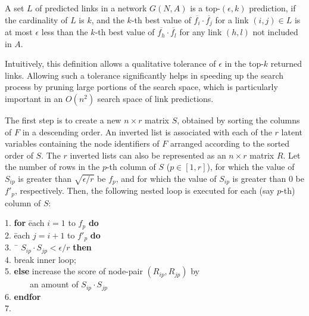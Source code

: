 \begin{definition}[top-$(\epsilon, k)$ predictions]
A set $L$ of predicted links in a network $G(N, A)$ is a top-$(\epsilon, k)$ prediction, if
the cardinality of $L$ is $k$, and the $k$-th best  value of
$\overline{f_i} \cdot \overline{f_j} $ for a link $(i, j) \in L$ is
at most $\epsilon$ less than the $k$-th best value of
$\overline{f_h} \cdot \overline{f_l}$ for any link $(h , l)$ not included in $A$.
\end{definition}
Intuitively, this definition allows a qualitative  tolerance of
$\epsilon$ in the top-$k$ returned links. Allowing such a tolerance
significantly helps in speeding up the search process by pruning
large portions of the search space, which is particularly important
in an $O(n^2)$ search space of link predictions.

The first step is to create a new $n \times r$ matrix $S$,
obtained by sorting the columns of $F$ in a descending order. An inverted list is
associated with each of the $r$ latent variables containing the node
identifiers  of $F$ arranged according to the sorted order of $S$. The
$r$ inverted lists can also be represented as an $n \times r$ matrix
$R$. Let the number of rows in the $p$-th column of $S$ ($p\in[1, r]$), for which
the value of $S_{ip}$ is greater than $\sqrt{\epsilon/r}$ be $f_p$, and for which the value of $S_{ip}$ is greater than 0 be $f'_p$, respectively.
%
Then, the following nested loop is executed for each (say $p$-th) column of $S$:

\begin{tabbing}1. \hspace{5ex}\=
{\bf for} \= each $i=1$ to $f_p$ {\bf do}\\
2. \> \= each $j=i+1$ to $f'_p$ {\bf do}\\
3. \>\>\ \= $S_{ip} \cdot S_{jp} < \epsilon/r$ {\bf then}\\
4. \>\>\>\>break inner loop; \\
5. \>\>\> {\bf else} increase the score of node-pair $(R_{ip}, R_{jp})$ by \\
   \>\>\> \ \ \ \ \ \ an amount of $S_{ip} \cdot S_{jp}$\\
6. \>\> {\bf endfor}\\
7. 
\end{tabbing}

